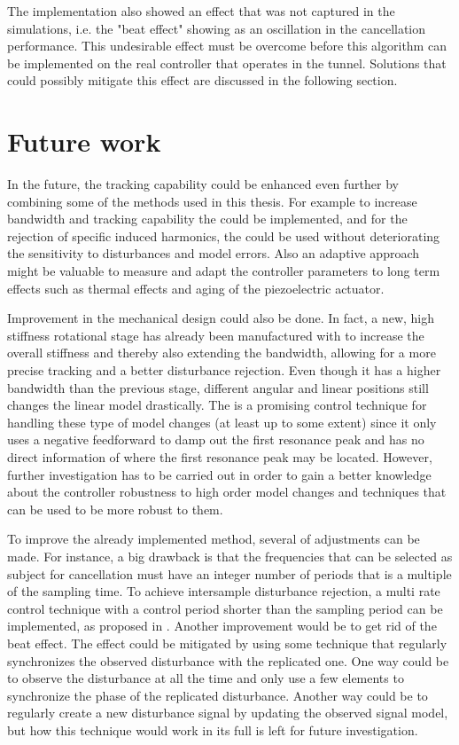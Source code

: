 The implementation also showed an effect that was not captured in the simulations, i.e. the "beat effect" showing as an oscillation in the cancellation performance. This undesirable effect must be overcome before this algorithm can be implemented on the real controller that operates in the \abbrLHC tunnel. Solutions that could possibly mitigate this effect are discussed in the following section.

\section{Future work}
In the future, the tracking capability could be enhanced even further by combining some of the methods used in this thesis. For example to increase bandwidth and tracking capability the \abbrIRC could be implemented, and for the rejection of specific induced harmonics, the \abbrRFDC could be used without deteriorating the sensitivity to disturbances and model errors. Also an adaptive approach might be valuable to measure and adapt the controller parameters to long term effects such as thermal effects and aging of the piezoelectric actuator.

Improvement in the mechanical design could also be done. In fact, a new, high stiffness rotational stage has already been manufactured with to increase the overall stiffness and thereby also extending the bandwidth, allowing for a more precise tracking and a better disturbance rejection. Even though it has a higher bandwidth than the previous stage, different angular and linear positions still changes the linear model drastically. The \abbrIRC is a promising control technique for handling these type of model changes (at least up to some extent) since it only uses a negative feedforward to damp out the first resonance peak and has no direct information of where the first resonance peak may be located. However, further investigation has to be carried out in order to gain a better knowledge about the controller robustness to high order model changes and techniques that can be used to be more robust to them.

To improve the already implemented \abbrRFDC method, several of adjustments can be made. For instance, a big drawback is that the frequencies that can be selected as subject for cancellation must have an integer number of periods that is a multiple of the sampling time. To achieve intersample disturbance rejection, a multi rate control technique with a control period shorter than the sampling period can be implemented, as proposed in \citep{fujimoto2009rro}. Another improvement would be to get rid of the beat effect. The effect could be mitigated by using some technique that regularly synchronizes the observed disturbance with the replicated one. One way could be to observe the disturbance at all the time and only use a few elements to synchronize the phase of the replicated disturbance. Another way could be to regularly create a new disturbance signal by updating the observed signal model, but how this technique would work in its full is left for future investigation.

